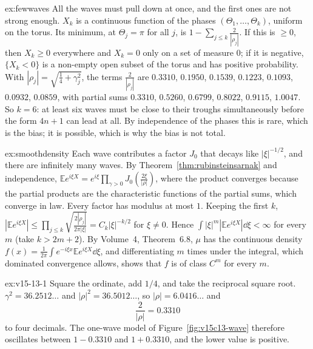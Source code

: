 \begin{solution}{ex:fewwaves}
\idea All the waves must pull down at once, and the first ones are not strong enough.
\writeup $X_k$ is a continuous function of the phases $(\Theta_1,\dots,\Theta_k)$, uniform on the torus. Its minimum, at $\Theta_j=\pi$ for all $j$, is $1-\sum_{j\le k}\frac2{|\rho_j|}$. If this is $\ge0$, then $X_k\ge0$ everywhere and $X_k=0$ only on a set of measure $0$; if it is negative, $\{X_k<0\}$ is a non-empty open subset of the torus and has positive probability. With $|\rho_j|=\sqrt{\frac14+\gamma_j^2}$, the terms $\frac2{|\rho_j|}$ are $0.3310$, $0.1950$, $0.1539$, $0.1223$, $0.1093$, $0.0932$, $0.0859$, with partial sums $0.3310$, $0.5260$, $0.6799$, $0.8022$, $0.9115$, $1.0047$. So $k=6$: at least six waves must be close to their troughs simultaneously before the form $4n+1$ can lead at all. By independence of the phases this is rare, which is the bias; it is possible, which is why the bias is not total.
\end{solution}

\begin{solution}{ex:smoothdensity}
\idea Each wave contributes a factor $J_0$ that decays like $|\xi|^{-1/2}$, and there are infinitely many waves.
\writeup By Theorem~\ref{thm:rubinsteinsarnak} and independence, $\mathbb Ee^{i\xi X}=e^{i\xi}\prod_{\gamma>0}J_0(\frac{2\xi}{|\rho|})$, where the product converges because the partial products are the characteristic functions of the partial sums, which converge in law. Every factor has modulus at most $1$. Keeping the first $k$, $|\mathbb Ee^{i\xi X}|\le\prod_{j\le k}\sqrt{\frac{2|\rho_j|}{2\pi|\xi|}}=C_k|\xi|^{-k/2}$ for $\xi\ne0$. Hence $\int|\xi|^m|\mathbb Ee^{i\xi X}|\dd\xi<\infty$ for every $m$ (take $k>2m+2$). By Volume~4, Theorem~6.8, $\mu$ has the continuous density $f(x)=\frac1{2\pi}\int e^{-i\xi x}\mathbb Ee^{i\xi X}\dd\xi$, and differentiating $m$ times under the integral, which dominated convergence allows, shows that $f$ is of class $C^m$ for every $m$.
\end{solution}

\begin{solution}{ex:v15-13-1}
\idea Square the ordinate, add \(1/4\), and take the reciprocal square root.
\writeup \(\gamma^2=36.2512\ldots\) and \(|\rho|^2=36.5012\ldots\), so \(|\rho|=6.0416\ldots\) and
\[
\frac2{|\rho|}=0.3310
\]
to four decimals. The one-wave model of Figure~\ref{fig:v15c13-wave} therefore oscillates between \(1-0.3310\) and \(1+0.3310\), and the lower value is positive.
\end{solution}

